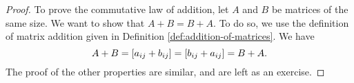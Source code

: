 \begin{proof}
  To prove the commutative law of addition, let $A$ and $B$ be
  matrices of the same size. We want to show that $A+B=B+A$. To do so,
  we use the definition of matrix addition given in Definition
  \ref{def:addition-of-matrices}.  We have
  \begin{equation*}
    A+B = \left[a_{ij}+b_{ij}\right] = \left[b_{ij}+a_{ij}\right] = B+A.
  \end{equation*}
  The proof of the other properties are similar, and are left as an
  exercise.
\end{proof}
